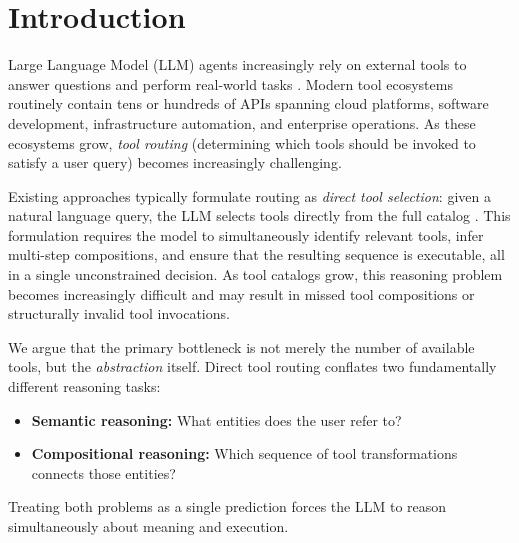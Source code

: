 
\section{Introduction}
\label{sec:introduction}

Large Language Model (LLM) agents increasingly rely on external tools to answer questions and perform real-world tasks \cite{yao2023react, shen2023hugginggpt}. Modern tool ecosystems routinely contain tens or hundreds of APIs spanning cloud platforms, software development, infrastructure automation, and enterprise operations. As these ecosystems grow, \emph{tool routing} (determining which tools should be invoked to satisfy a user query) becomes increasingly challenging.

Existing approaches typically formulate routing as \emph{direct tool selection}: given a natural language query, the LLM selects tools directly from the full catalog \cite{li2025toolscope, qin2024toolllm}. This formulation requires the model to simultaneously identify relevant tools, infer multi-step compositions, and ensure that the resulting sequence is executable, all in a single unconstrained decision. As tool catalogs grow, this reasoning problem becomes increasingly difficult and may result in missed tool compositions or structurally invalid tool invocations.

We argue that the primary bottleneck is not merely the number of available tools, but the \emph{abstraction} itself. Direct tool routing conflates two fundamentally different reasoning tasks:

\begin{itemize}
    \item \textbf{Semantic reasoning:} What entities does the user refer to?
    \item \textbf{Compositional reasoning:} Which sequence of tool transformations connects those entities?
\end{itemize}

Treating both problems as a single prediction forces the LLM to reason simultaneously about meaning and execution.

